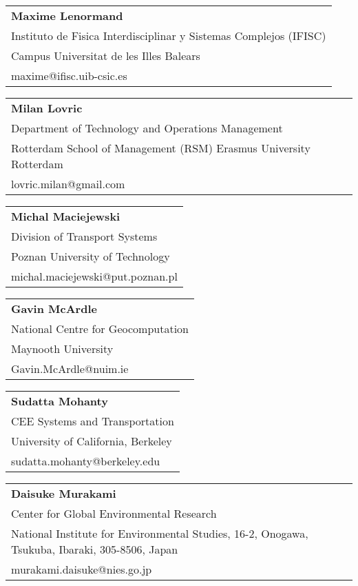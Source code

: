 \begin{tabular}[width=0.48\textwidth]{@{}l}
\textbf{Maxime Lenormand} \\
Instituto de Fisica Interdisciplinar y Sistemas Complejos (IFISC) \\
Campus Universitat de les Illes Balears \\
maxime@ifisc.uib-csic.es   \\
\end{tabular}

\begin{tabular}[width=0.48\textwidth]{@{}l}
\textbf{Milan Lovric} \\
Department of Technology and Operations Management \\
Rotterdam School of Management (RSM) Erasmus University Rotterdam \\
lovric.milan@gmail.com  \\
\end{tabular}

\begin{tabular}[width=0.48\textwidth]{@{}l}
\textbf{Michal Maciejewski} \\
Division of Transport Systems \\
Poznan University of Technology \\
michal.maciejewski@put.poznan.pl \\
\end{tabular}

\begin{tabular}[width=0.48\textwidth]{@{}l}
\textbf{Gavin McArdle} \\
National Centre for Geocomputation \\
Maynooth University \\
Gavin.McArdle@nuim.ie \\
\end{tabular}

\begin{tabular}[width=0.48\textwidth]{@{}l}
\textbf{Sudatta Mohanty} \\
CEE Systems and Transportation \\
University of California, Berkeley \\
sudatta.mohanty@berkeley.edu \\
\end{tabular}

\begin{tabular}[width=0.48\textwidth]{@{}l}
\textbf{Daisuke Murakami} \\
Center for Global Environmental Research \\
National Institute for Environmental Studies, 16-2, Onogawa, Tsukuba, Ibaraki, 305-8506, Japan \\
murakami.daisuke@nies.go.jp  \\
\end{tabular}


